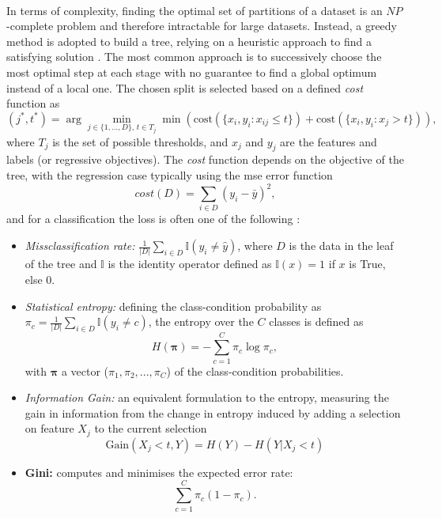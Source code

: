 \paragraph{}In terms of complexity, finding the optimal set of partitions of a dataset is an $NP$-complete problem and therefore intractable for large datasets. Instead, a greedy method is adopted to build a tree, relying on a heuristic approach to find a satisfying solution \cite{MurphyML}. The most common approach is to successively choose the most optimal step at each stage with no guarantee to find a global optimum instead of a local one. The chosen split is selected based on a defined \textit{cost} function as
\begin{equation}\label{eq:DTcost}
    (j^*, t^*) = \arg\min_{j\in \{1, ..., D\},\, t \in T_j} \min \left(\text{cost} (\{x_i, y_i : x_{ij} \leq t\}) + \text{cost}(\{x_i, y_i : x_j > t\}) \right),
\end{equation}
where $T_j$ is the set of possible thresholds, and $x_j$ and $y_j$ are the features and labels (or regressive objectives). The \textit{cost} function depends on the objective of the tree, with the regression case typically using the \gls{mse} error function \[cost(D) = \sum_{i\in D}(y_i - \bar{y})^2,\] and for a classification the loss is often one of the following \cite{MurphyML}:
\begin{itemize}
    \item \textit{Missclassification rate:} $\frac{1}{|D|} \sum_{i \in D} \mathbb{I}(y_i \neq \hat{y})$, where $D$ is the data in the leaf of the tree and $\mathbb{I}$ is the identity operator defined as $\mathbb{I}(x) = 1$ if $x$ is True, else $0$. 
    \item \textit{Statistical entropy:} defining the class-condition probability as $\pi_c = \frac{1}{|D|} \sum_{i \in D} \mathbb{I}(y_i \neq c)$, the entropy over the $C$ classes is defined as
    \begin{equation}\label{eq:statEntropy}
        H(\boldsymbol{\pi}) = - \sum_{c=1}^C \pi_c \log \pi_c,
    \end{equation}
    with $\boldsymbol{\pi}$ a vector ($\pi_1, \pi_2, ..., \pi_C$) of the class-condition probabilities.
    \item \textit{Information Gain:} an equivalent formulation to the entropy, measuring the gain in information from the change in entropy induced by adding a selection on feature $X_j$ to the current selection 
    \[ \text{Gain}(X_j < t, Y) = H(Y) - H(Y | X_j < t) \]
    \item \textbf{Gini:} computes and minimises the expected error rate:
    \begin{equation}\label{eq:giniClass} 
        \sum_{c=1}^C \pi_c (1 - \pi_c).
    \end{equation}
\end{itemize}

